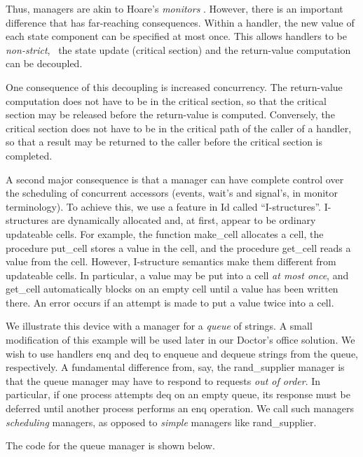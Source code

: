 Thus, managers are akin to Hoare's {\em monitors\/} \cite{Hoare74}.
However, there is an important difference that has far-reaching
consequences.  Within a handler, the new value of each state component
can be specified at most once.  This allows handlers to be {\em
non-strict\/}, \ie\ the state update (critical section) and the
return-value computation can be decoupled.

One consequence of this decoupling is increased concurrency.  The
return-value computation does not have to be in the critical section,
so that the critical section may be released before the return-value
is computed.  Conversely, the critical section does not have to be in
the critical path of the caller of a handler, so that a result may be
returned to the caller before the critical section is completed.

A second major consequence is that a manager can have complete control
over the scheduling of concurrent accessors (events, {\cf wait}'s and
{\cf signal}'s, in monitor terminology).  To achieve this, we use a
feature in Id called ``I-structures''.  I-structures are dynamically
allocated and, at first, appear to be ordinary updateable cells.  For
example, the function {\cf make\_cell} allocates a cell, the procedure
{\cf put\_cell} stores a value in the cell, and the procedure {\cf
get\_cell} reads a value from the cell.  However, I-structure
semantics make them different from updateable cells.  In particular, a
value may be put into a cell {\em at most once\/}, and {\cf get\_cell}
automatically blocks on an empty cell until a value has been written
there.  An error occurs if an attempt is made to put a value twice
into a cell.

We illustrate this device with a manager for a {\em queue\/} of
strings.  A small modification of this example will be used later in
our Doctor's office solution.  We wish to use handlers {\cf enq} and
{\cf deq} to enqueue and dequeue strings from the queue, respectively.
A fundamental difference from, say, the {\cf rand\_supplier} manager
is that the queue manager may have to respond to requests {\em out of
order\/}.  In particular, if one process attempts {\cf deq} on an
empty queue, its response must be deferred until another process
performs an {\cf enq} operation.  We call such managers {\em
scheduling\/} managers, as opposed to {\em simple\/} managers
like {\cf rand\_supplier}.

The code for the queue manager is shown below.

